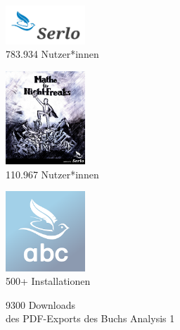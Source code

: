 \documentclass[aspectratio=169]{beamer}
\begin{document}
\begin{frame}
    \Large
    \vfill

    \begin{minipage}[b]{0.3\textwidth}
        \centering
        \includegraphics[width=3cm]{serlo-logo.png}
        \\[0.5em]
        783.934 Nutzer*innen\footnotemark[1]
    \end{minipage}
    \hfill
    \begin{minipage}[b]{0.3\textwidth}
        \centering
        \includegraphics[width=3cm]{mfnf-logo.jpg}
        \\[0.5em]
        110.967 Nutzer*innen\footnotemark[1]
    \end{minipage}
    \hfill
    \begin{minipage}[b]{0.3\textwidth}
        \centering
        \includegraphics[width=3cm]{serlo-abc-logo.png}
        \\[0.5em]
        500+ Installationen\footnotemark[1]
    \end{minipage}

    \begin{center}
        9300 Downloads \\ des PDF-Exports des Buchs Analysis 1
    \end{center}

\end{frame}
\end{document}
